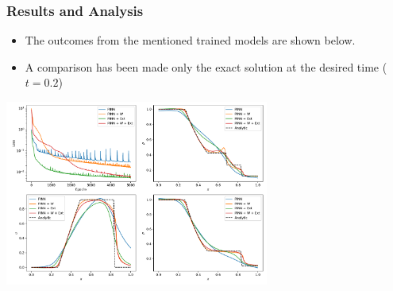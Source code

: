 \documentclass[aspectratio=169]{beamer}
\begin{document}
\begin{frame}\frametitle{Results and Analysis}
	
	
	\begin{itemize}
		\item The outcomes from the mentioned trained models are shown below.
		\item A comparison has been made only the exact solution at the desired time ($t=0.2$)
	\end{itemize}
	
	\begin{center}
		\includegraphics[width=0.65\textwidth]{Figures/preliminary_results.pdf}
	\end{center}
\end{frame}
\end{document}
